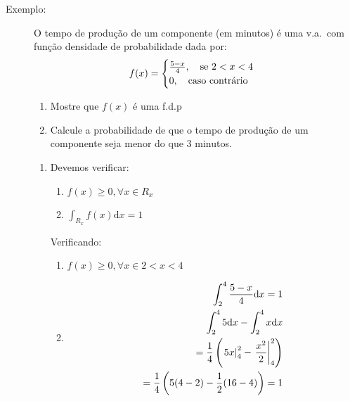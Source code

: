 \begin{description}
\begin{description}
       \end{description}
     \item [Exemplo:] 
       O tempo de produção de um componente (em minutos) é uma v.a.\ com função densidade 
       de probabilidade dada por: 
       \begin{align}
         f(x)=
         \begin{cases}
           \frac{5-x}{4}, \text{\quad se $2<x<4$}\\
           0,\text{\quad caso contrário} 
         \end{cases}
       \end{align}
       \begin{enumerate}[label=(\alph*)]
         \item Mostre que $f(x)$ é uma f.d.p
         \item Calcule a probabilidade de que o tempo de produção de um componente 
           seja menor do que 3 minutos.
       \end{enumerate}
       \begin{enumerate}[label=(\alph*)]
         \item Devemos verificar: 
           \begin{enumerate}[leftmargin=*, label=\roman*., widest=IV, align=left] %
             \item $f(x)\geq 0, \forall x \in R_{x}$
             \item $\int_{R_{x}} f(x)\mathrm{d}x=1$
           \end{enumerate}

           Verificando:
           \begin{enumerate}[leftmargin=*, label=\roman*., widest=IV, align=left] %
             \item $f(x)\geq 0, \forall x \in  2<x<4$
             \item 
               \begin{align*}
                 \int_{2}^4 \frac{5-x}{4}\mathrm{d}x=1\\
                 \int_{2}^4 5 \mathrm{d}x - \int_{2}^4 x \mathrm{d}x  \\
                 = \frac{1}{4}  \left(\left.5x\right\rvert_{4}^{2} - \left.\frac{x^2}{2}\right\rvert_{4}^{2}\right) \\
                 = \frac{1}{4} \left(5(4-2)- \frac{1}{2}(16-4) \right)= 1
               \end{align*}


\end{enumerate}
\end{enumerate}
\end{description}
